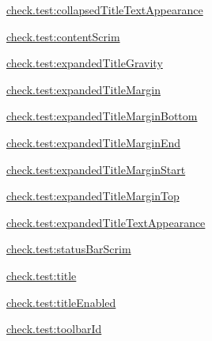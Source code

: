 {\ttfamily \hyperlink{classcheck_1_1test_1_1_r_1_1styleable_af8c6af1685175b4f7441abd8ac238f71}{check.\+test\+:collapsed\+Title\+Text\+Appearance}}

{\ttfamily \hyperlink{classcheck_1_1test_1_1_r_1_1styleable_aafa0dc99209d496d21b18f2db67597f1}{check.\+test\+:content\+Scrim}}

{\ttfamily \hyperlink{classcheck_1_1test_1_1_r_1_1styleable_a111ed46d59211ccdd56c892aa2be9eb6}{check.\+test\+:expanded\+Title\+Gravity}}

{\ttfamily \hyperlink{classcheck_1_1test_1_1_r_1_1styleable_ab6768f81043a9099ccaa6b71b1e063b7}{check.\+test\+:expanded\+Title\+Margin}}

{\ttfamily \hyperlink{classcheck_1_1test_1_1_r_1_1styleable_afd2cccb26f6d0c7f231c62cd008c5963}{check.\+test\+:expanded\+Title\+Margin\+Bottom}}

{\ttfamily \hyperlink{classcheck_1_1test_1_1_r_1_1styleable_a7c45bb4250b94c50e63037e285cbce79}{check.\+test\+:expanded\+Title\+Margin\+End}}

{\ttfamily \hyperlink{classcheck_1_1test_1_1_r_1_1styleable_a9998f98d1bc4ccd614b3102b27346107}{check.\+test\+:expanded\+Title\+Margin\+Start}}

{\ttfamily \hyperlink{classcheck_1_1test_1_1_r_1_1styleable_a33f7e13e75737dc7d53feb23164abfcf}{check.\+test\+:expanded\+Title\+Margin\+Top}}

{\ttfamily \hyperlink{classcheck_1_1test_1_1_r_1_1styleable_a01bf5ec327b8ed9194b323abcf3f914c}{check.\+test\+:expanded\+Title\+Text\+Appearance}}

{\ttfamily \hyperlink{classcheck_1_1test_1_1_r_1_1styleable_a2475ffb2f49d975dd9c976b973c3385f}{check.\+test\+:status\+Bar\+Scrim}}

{\ttfamily \hyperlink{classcheck_1_1test_1_1_r_1_1styleable_af9921604bea0ce807ca10fd495eb7f48}{check.\+test\+:title}}

{\ttfamily \hyperlink{classcheck_1_1test_1_1_r_1_1styleable_ab762976306f550b00c8cb1c7ed31cd44}{check.\+test\+:title\+Enabled}}

{\ttfamily \hyperlink{classcheck_1_1test_1_1_r_1_1styleable_ab00225a14bdf82c12e0532781e9bb655}{check.\+test\+:toolbar\+Id}}

